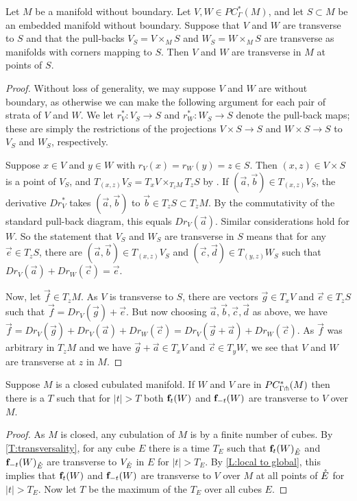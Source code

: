 \begin{lemma}\label{L:local to global}
	Let $M$ be a manifold without boundary.
	Let $V, W \in PC^*_\Gamma(M)$, and let $S \subset M$ be an embedded manifold without boundary.
	Suppose that $V$ and $W$ are transverse to $S$ and that the pull-backs $V_S = V \times_M S$ and $W_S = W \times_M S$ are transverse as manifolds with corners mapping to $S$.
	Then $V$ and $W$ are transverse in $M$ at points of $S$.
\end{lemma}
\begin{proof}
	Without loss of generality, we may suppose $V$ and $W$ are without boundary, as otherwise we can make the following argument for each pair of strata of $V$ and $W$.
	We let $r_V^* \colon V_S \to S$ and $r_W^* \colon W_S \to S$ denote the pull-back maps; these are simply the restrictions of the projections $V \times S \to S$ and $W \times S \to S$ to $V_S$ and $W_S$, respectively.

	Suppose $x \in V$ and $y \in W$ with $r_V(x) = r_W(y) = z \in S$.
	Then $(x,z) \in V \times S$ is a point of $V_S$, and $T_{(x,z)}V_S = T_xV \times_{T_zM} T_zS$ by \cite[Lemma 2.28]{medina2022foundations}.
	If $(\vec a,\vec b) \in T_{(x,z)}V_S$, the derivative $Dr_V^*$ takes $(\vec a,\vec b)$ to $\vec b \in T_z S \subset T_zM$.
	By the commutativity of the standard pull-back diagram, this equals $Dr_V(\vec a)$.
	Similar considerations hold for $W$.
	So the statement that $V_S$ and $W_S$ are transverse in $S$ means that for any $\vec e \in T_z S$, there are $(\vec a,\vec b) \in T_{(x,z)}V_S$ and $(\vec c,\vec d) \in T_{(y,z)}W_S$ such that $Dr_V(\vec a) + Dr_W(\vec c) = \vec e$.

	Now, let $\vec f \in T_z M$.
	As $V$ is transverse to $S$, there are vectors $\vec g \in T_x V$ and  $\vec e \in T_z S$ such that $\vec f = Dr_V(\vec g) + \vec e$.
	But now choosing $\vec a,\vec b,\vec c,\vec d$ as above, we have $\vec f = Dr_V(\vec g) + Dr_V(\vec a) + Dr_W(\vec c) = Dr_V(\vec g + \vec a) +Dr_W(\vec c)$.
	As $\vec f$ was arbitrary in $T_zM$ and we have $\vec g + \vec a \in T_x V$ and $\vec c \in T_y W$, we see that $V$ and $W$ are transverse at $z$ in $M$.
\end{proof}

\begin{corollary}
	Suppose $M$ is a closed cubulated manifold.
	If $W$ and $V$ are in $PC_{\Gamma \pitchfork}^*(M)$ then there is a $T$ such that for $|t|>T$ both $\mathbf{f}_t(W)$ and $\mathbf{f}_{-t}(W)$ are transverse to $V$ over $M$.
\end{corollary}
\begin{proof}
	As $M$ is closed, any cubulation of $M$ is by a finite number of cubes.
	By \cref{T:transversality}, for any cube $E$ there is a time $T_E$ such that $\mathbf{f}_t(W)_{\mathring{E}}$ and $\mathbf{f}_{-t}(W)_{\mathring{E}}$ are transverse to $V_{\mathring{E}}$ in $E$ for $|t| > T_E$.
	By \cref{L:local to global}, this implies that $\mathbf{f}_t(W)$ and $\mathbf{f}_{-t}(W)$ are transverse to $V$ over $M$ at all points of $\mathring{E}$ for $|t| > T_E$.
	Now let $T$ be the maximum of the $T_E$ over all cubes $E$.
\end{proof}

